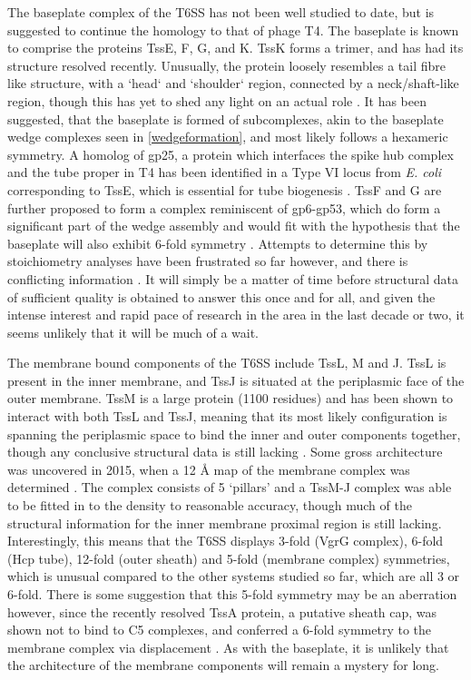 The baseplate complex of the T6SS has not been well studied to date, but is suggested to continue the homology to that of phage T4. The baseplate is known to comprise the proteins TssE, F, G, and K. TssK forms a trimer, and has had its structure resolved recently. Unusually, the protein loosely resembles a tail fibre like structure, with a `head` and `shoulder` region, connected by a neck/shaft-like region, though this has yet to shed any light on an actual role \citep{Desmyter2015, English2014}. It has been suggested, that the baseplate is formed of subcomplexes, akin to the baseplate wedge complexes seen in \vref{wedgeformation}, and most likely follows a hexameric symmetry. A homolog of gp25, a protein which interfaces the spike hub complex and the tube proper in T4 has been identified in a Type VI locus from \emph{E. coli} corresponding to TssE, which is essential for tube biogenesis \citep{Nguyen2018, Brunet2013, Leiman2009}. TssF and G are further proposed to form a complex reminiscent of gp6-gp53, which do form a significant part of the wedge assembly and would fit with the hypothesis that the baseplate will also exhibit 6-fold symmetry \citep{Nguyen2018}. Attempts to determine this by stoichiometry analyses have been frustrated so far however, and there is conflicting information \citep{Nguyen2018, Nazarov2017}. It will simply be a matter of time before structural data of sufficient quality is obtained to answer this once and for all, and given the intense interest and rapid pace of research in the area in the last decade or two, it seems unlikely that it will be much of a wait.

The membrane bound components of the T6SS include TssL, M and J. TssL is present in the inner membrane, and TssJ is situated at the periplasmic face of the outer membrane. TssM is a large protein (1100 residues) and has been shown to interact with both TssL and TssJ, meaning that its most likely configuration is spanning the periplasmic space to bind the inner and outer components together, though any conclusive structural data is still lacking \citep{Zheng2007, Ma2009, Felisberto-Rodrigues2011, Nguyen2018}. Some gross architecture was uncovered in 2015, when a 12 \AA{} map of the membrane complex was determined \citep{Durand2015}. The complex consists of 5 `pillars' and a TssM-J complex was able to be fitted in to the density to reasonable accuracy, though much of the structural information for the inner membrane proximal region is still lacking. Interestingly, this means that the T6SS displays 3-fold (VgrG complex), 6-fold (Hcp tube), 12-fold (outer sheath) and 5-fold (membrane complex) symmetries, which is unusual compared to the other systems studied so far, which are all 3 or 6-fold. There is some suggestion that this 5-fold symmetry may be an aberration however, since the recently resolved TssA protein, a putative sheath cap, was shown not to bind to C5 complexes, and conferred a 6-fold symmetry to the membrane complex via displacement \citep{Zoued2016}. As with the baseplate, it is unlikely that the architecture of the membrane components will remain a mystery for long.


